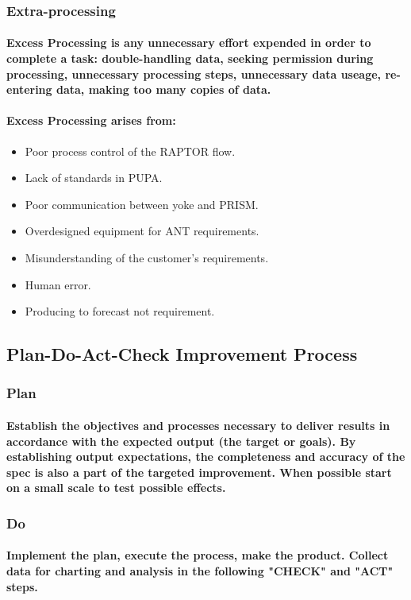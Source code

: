 \documentclass{acm_proc_article-sp}
\begin{document}
\subsubsection{Extra-processing}
\paragraph{Excess Processing is any unnecessary effort expended in order to complete a task: double-handling data, seeking permission during processing, unnecessary processing steps, unnecessary data useage, re-entering data, making too many copies of data.}
\paragraph{Excess Processing arises from:}
\begin{itemize}
\item Poor process control of the RAPTOR flow.
\item Lack of standards in PUPA.
\item Poor communication between yoke and PRISM.
\item Overdesigned equipment for ANT requirements.
\item Misunderstanding of the customer's requirements.
\item Human error.
\item Producing to forecast not requirement.
\end{itemize}
\subsection{Plan-Do-Act-Check Improvement Process}
\subsubsection{Plan}
\paragraph{Establish the objectives and processes necessary to deliver results in accordance with the expected output (the target or goals). By establishing output expectations, the completeness and accuracy of the spec is also a part of the targeted improvement. When possible start on a small scale to test possible effects.}
\subsubsection{Do}
\paragraph{Implement the plan, execute the process, make the product. Collect data for charting and analysis in the following "CHECK" and "ACT" steps.}
\end{document}
